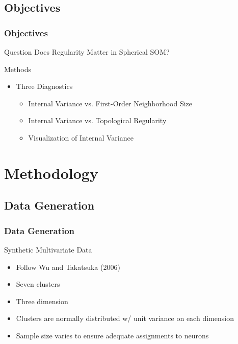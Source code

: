 \documentclass[nototal,handout]{beamer}
\begin{document}
\subsection{Objectives} 

\begin{frame}
	\frametitle{Objectives}
 
\begin{block}{Question}
  Does Regularity Matter in Spherical SOM?
 \end{block} 
\begin{block}{Methods}
 \begin{itemize}
 \item  Three Diagnostics
 \begin{itemize}
 \item  Internal Variance vs. First-Order Neighborhood Size
 \item  Internal Variance vs. Topological Regularity
 \item  Visualization of Internal Variance
 \end{itemize}
 \end{itemize}
 \end{block} \end{frame} 


\section{Methodology} 

\subsection{Data Generation} 

\begin{frame}
	\frametitle{Data Generation}
 
\begin{block}{Synthetic Multivariate Data}
 \begin{itemize}
 \item  Follow Wu and Takatsuka (2006)
 \item  Seven clusters
 \item  Three dimension
 \item  Clusters are normally distributed w/ unit variance on each dimension
 \item  Sample size varies to ensure adequate assignments to neurons
 \end{itemize}
 \end{block} \end{frame} 
\end{document}
